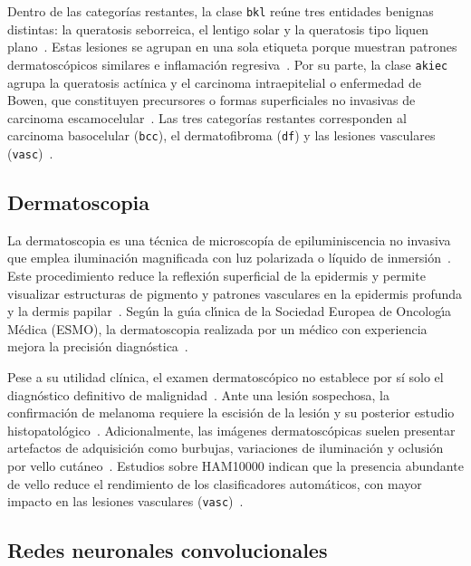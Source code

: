 Dentro de las categorías restantes, la clase \texttt{bkl} reúne tres entidades benignas distintas: la queratosis seborreica, el lentigo solar y la queratosis tipo liquen plano~\cite{tschandl2018ham10000}. Estas lesiones se agrupan en una sola etiqueta porque muestran patrones dermatoscópicos similares e inflamación regresiva~\cite{tschandl2018ham10000}. Por su parte, la clase \texttt{akiec} agrupa la queratosis actínica y el carcinoma intraepitelial o enfermedad de Bowen, que constituyen precursores o formas superficiales no invasivas de carcinoma escamocelular~\cite{tschandl2018ham10000}. Las tres categorías restantes corresponden al carcinoma basocelular (\texttt{bcc}), el dermatofibroma (\texttt{df}) y las lesiones vasculares (\texttt{vasc})~\cite{tschandl2018ham10000}.

\subsection{Dermatoscopia}

La dermatoscopia es una técnica de microscopía de epiluminiscencia no invasiva que emplea iluminación magnificada con luz polarizada o líquido de inmersión~\cite{amaral2025esmo,tschandl2018ham10000}. Este procedimiento reduce la reflexión superficial de la epidermis y permite visualizar estructuras de pigmento y patrones vasculares en la epidermis profunda y la dermis papilar~\cite{tschandl2018ham10000}. Seg\'{u}n la gu\'{\i}a cl\'{\i}nica de la Sociedad Europea de Oncolog\'{\i}a M\'{e}dica (ESMO), la dermatoscopia realizada por un m\'{e}dico con experiencia mejora la precisi\'{o}n diagn\'{o}stica~\cite{amaral2025esmo}.

Pese a su utilidad clínica, el examen dermatoscópico no establece por sí solo el diagnóstico definitivo de malignidad~\cite{amaral2025esmo}. Ante una lesión sospechosa, la confirmación de melanoma requiere la escisión de la lesión y su posterior estudio histopatológico~\cite{amaral2025esmo}. Adicionalmente, las imágenes dermatoscópicas suelen presentar artefactos de adquisición como burbujas, variaciones de iluminación y oclusión por vello cutáneo~\cite{lee1997dullrazor,wang2024hair}. Estudios sobre HAM10000 indican que la presencia abundante de vello reduce el rendimiento de los clasificadores automáticos, con mayor impacto en las lesiones vasculares (\texttt{vasc})~\cite{wang2024hair}.

\subsection{Redes neuronales convolucionales}

